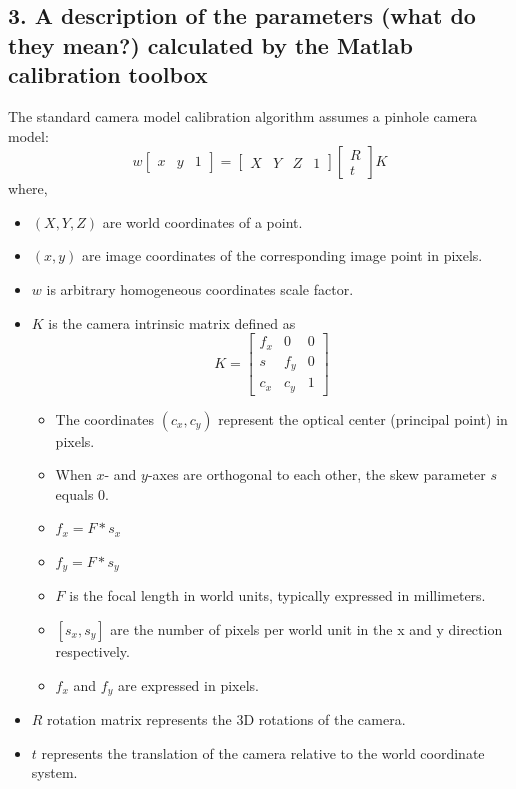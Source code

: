 \subsection*{3. A description of the parameters (what do they mean?) calculated by the Matlab calibration toolbox}
The standard camera model calibration algorithm assumes a pinhole camera model:
\begin{equation}
w \begin{bmatrix} x & y & 1 \end{bmatrix} = \begin{bmatrix} X & Y & Z & 1 \end{bmatrix} \begin{bmatrix} R \\ t \end{bmatrix} K
\end{equation}
where,
\begin{itemize}
\item $(X,Y,Z)$ are world coordinates of a point.
\item $(x,y)$ are image coordinates of the corresponding image point in pixels.
\item $w$ is arbitrary homogeneous coordinates scale factor.
\item $K$ is the camera intrinsic matrix defined as
\begin{equation}
K = \begin{bmatrix}
f_x & 0 & 0 \\
s & f_y & 0 \\
c_x & c_y & 1
\end{bmatrix}
\end{equation} 
\begin{itemize}
\item The coordinates $(c_x, c_y)$ represent the optical center (principal point) in pixels.
\item When $x$- and $y$-axes are orthogonal to each other, the skew parameter $s$ equals $0$.
\item $f_x = F*s_x$
\item $f_y = F*s_y$
\item $F$ is the focal length in world units, typically expressed in millimeters.
\item $[s_x, s_y]$  are the number of pixels per world unit in the x and y direction respectively.
\item $f_x$ and $f_y$ are expressed in pixels.
\end{itemize}
\item $R$ rotation matrix represents the 3D rotations of the camera.
\item $t$ represents the translation of the camera relative to the world coordinate system.
\end{itemize}


